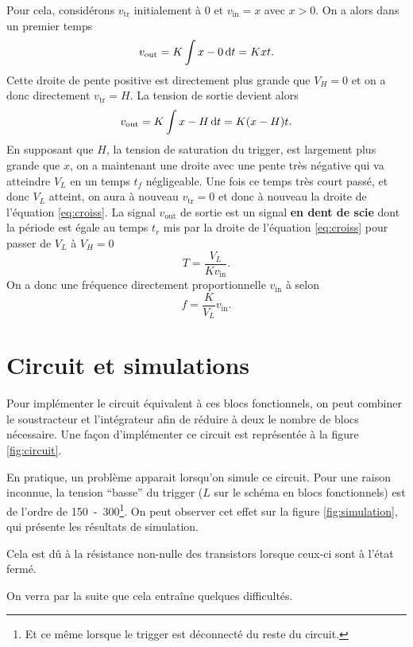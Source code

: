 Pour cela, considérons $v_{\text{tr}}$ initialement à \unit{0}{\volt}
et $v_{\text{in}} = x$ avec $x > 0$. On a alors dans un premier temps
\begin{equation}
	v_{\text{out}} = K\int x - 0 \operatorname{d}\! t = Kxt.
	\label{eq:croiss}
\end{equation}
Cette droite de pente positive est directement plus grande que $V_H = 0$
et on a donc directement $v_{\text{tr}} = H$. La tension de sortie
devient alors
\begin{equation}
	v_{\text{out}} = K\int x - H \operatorname{d}\! t = K(x-H)t.
	\label{eq:decroiss}
\end{equation}
En supposant que $H$, la tension de saturation du trigger, est largement
plus grande que $x$, on a maintenant une droite avec une pente
très négative qui va atteindre $V_L$ en un temps $t_f$ négligeable.
Une fois ce temps très court passé, et donc $V_L$ atteint, on aura
à nouveau $v_{\text{tr}} = 0$ et donc à nouveau la droite de
l'équation \ref{eq:croiss}. La signal $v_{\text{out}}$ de sortie
est un signal \textbf{en dent de scie} dont la période est
égale au temps $t_r$ mis par la droite de l'équation \ref{eq:croiss}
pour passer de $V_L$ à $V_H = 0$ 
\[ T = \frac{V_L}{Kv_\text{in}}. \]
On a donc une fréquence directement proportionnelle $v_\text{in}$ à
selon
\[ f = \frac{K}{V_L}v_\text{in}. \]

\section{Circuit et simulations}
Pour implémenter le circuit équivalent à ces blocs fonctionnels,
on peut combiner le soustracteur et l'intégrateur afin
de réduire à deux le nombre de blocs nécessaire. Une façon
d'implémenter ce circuit est représentée à la figure
\ref{fig:circuit}.

En pratique, un problème apparait lorsqu'on
simule ce circuit. Pour une raison inconnue,
la tension ``basse'' du trigger ($L$ sur le schéma
en blocs fonctionnels) est de l'ordre de 
\unit{150-300}{\milli\volt}\footnote{Et ce même
lorsque le trigger est déconnecté du reste du circuit.}.
On peut observer cet effet sur la figure \ref{fig:simulation},
qui présente les résultats de simulation.

\begin{correction}
	Cela est dû à la résistance non-nulle des transistors
	lorsque ceux-ci sont à l'état fermé.
\end{correction}

On verra par la suite que cela entraîne quelques
difficultés.

